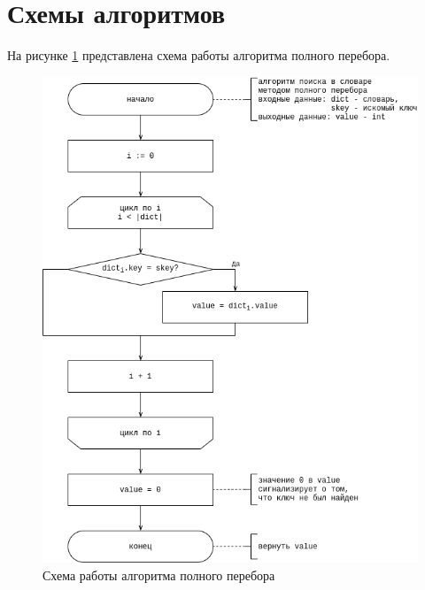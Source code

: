 \section{Схемы алгоритмов}\label{sec:design-flowcharts}
На рисунке \ref{fig:brute} представлена схема работы алгоритма полного перебора.
\begin{center}
	\begin{figure}[H]
		\centering
		\includegraphics[width=0.83\linewidth]{assets/dict-brute.drawio.png}
		\caption{Схема работы алгоритма полного перебора}
		\label{fig:brute}
	\end{figure}
\end{center}

